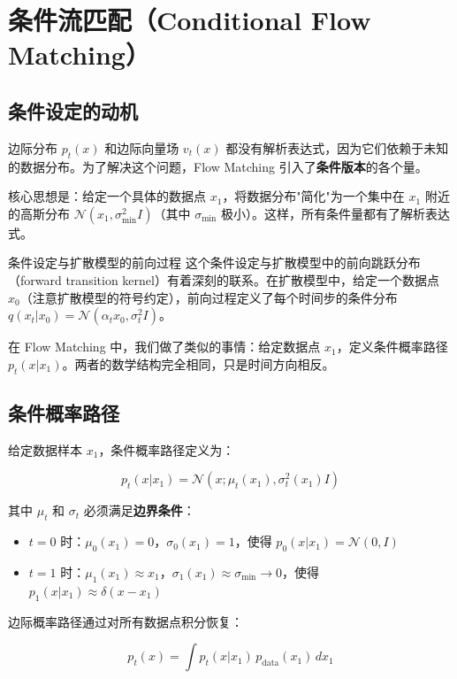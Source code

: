 \section{条件流匹配（Conditional Flow Matching）}

\subsection{条件设定的动机}

边际分布 $p_t(x)$ 和边际向量场 $v_t(x)$ 都没有解析表达式，因为它们依赖于未知的数据分布。为了解决这个问题，Flow Matching 引入了\textbf{条件版本}的各个量。

核心思想是：给定一个具体的数据点 $x_1$，将数据分布"简化"为一个集中在 $x_1$ 附近的高斯分布 $\mathcal{N}(x_1, \sigma_{\min}^2 I)$（其中 $\sigma_{\min}$ 极小）。这样，所有条件量都有了解析表达式。

\begin{knowledgebox}{条件设定与扩散模型的前向过程}
这个条件设定与扩散模型中的前向跳跃分布（forward transition kernel）有着深刻的联系。在扩散模型中，给定一个数据点 $x_0$（注意扩散模型的符号约定），前向过程定义了每个时间步的条件分布 $q(x_t | x_0) = \mathcal{N}(\alpha_t x_0, \sigma_t^2 I)$。

在 Flow Matching 中，我们做了类似的事情：给定数据点 $x_1$，定义条件概率路径 $p_t(x | x_1)$。两者的数学结构完全相同，只是时间方向相反。
\end{knowledgebox}

\subsection{条件概率路径}

给定数据样本 $x_1$，条件概率路径定义为：

$$p_t(x | x_1) = \mathcal{N}(x; \mu_t(x_1), \sigma_t^2(x_1) I)$$

其中 $\mu_t$ 和 $\sigma_t$ 必须满足\textbf{边界条件}：
\begin{itemize}
    \item $t = 0$ 时：$\mu_0(x_1) = 0$，$\sigma_0(x_1) = 1$，使得 $p_0(x | x_1) = \mathcal{N}(0, I)$
    \item $t = 1$ 时：$\mu_1(x_1) \approx x_1$，$\sigma_1(x_1) \approx \sigma_{\min} \to 0$，使得 $p_1(x | x_1) \approx \delta(x - x_1)$
\end{itemize}

边际概率路径通过对所有数据点积分恢复：

$$p_t(x) = \int p_t(x | x_1) \, p_{\text{data}}(x_1) \, dx_1$$


